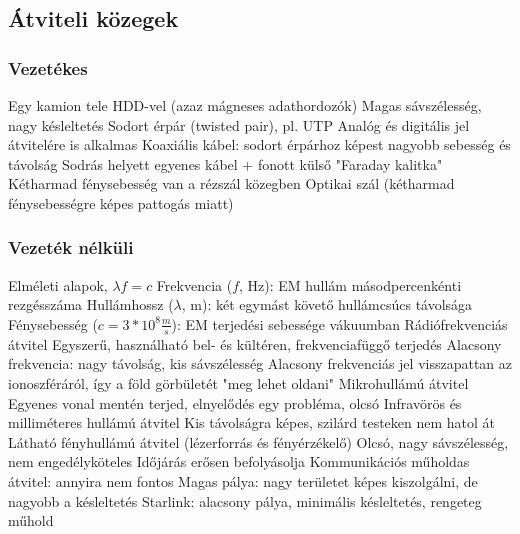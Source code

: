 \documentclass[12pt,a4paper]{article}
\begin{document}
\subsection{Átviteli közegek}

\subsubsection{Vezetékes}

\begin{outline}
	\1 Egy kamion tele HDD-vel (azaz mágneses adathordozók)
		\2 Magas sávszélesség, nagy késleltetés
	\1 Sodort érpár (twisted pair), pl. UTP
		\2 Analóg és digitális jel átvitelére is alkalmas
	\1 Koaxiális kábel: sodort érpárhoz képest nagyobb sebesség és távolság
		\2 Sodrás helyett egyenes kábel + fonott külső "Faraday kalitka"
		\2 Kétharmad fénysebesség van a rézszál közegben
	\1 Optikai szál (kétharmad fénysebességre képes pattogás miatt)
\end{outline}

\pagebreak

\subsubsection{Vezeték nélküli}

\begin{outline}
	\1 Elméleti alapok, $\lambda f = c$
		\2 Frekvencia ($f$, Hz): EM hullám másodpercenkénti rezgésszáma
		\2 Hullámhossz ($\lambda$, m): két egymást követő hullámcsúcs távolsága
		\2 Fénysebesség ($c=3*10^8 \frac{m}{s}$): EM terjedési sebessége vákuumban
	\1 Rádiófrekvenciás átvitel
		\2 Egyszerű, használható bel- és kültéren, frekvenciafüggő terjedés
		\2 Alacsony frekvencia: nagy távolság, kis sávszélesség
		\2 Alacsony frekvenciás jel visszapattan az ionoszféráról, így a föld görbületét "meg lehet oldani"
	\1 Mikrohullámú átvitel
		\2 Egyenes vonal mentén terjed, elnyelődés egy probléma, olcsó
	\1 Infravörös és milliméteres hullámú átvitel
		\2 Kis távolságra képes, szilárd testeken nem hatol át
	\1 Látható fényhullámú átvitel (lézerforrás és fényérzékelő)
		\2 Olcsó, nagy sávszélesség, nem engedélyköteles
		\2 Időjárás erősen befolyásolja
	\1 Kommunikációs műholdas átvitel: annyira nem fontos
		\2 Magas pálya: nagy területet képes kiszolgálni, de nagyobb a késleltetés
		\2 Starlink: alacsony pálya, minimális késleltetés, rengeteg műhold
\end{outline}

\pagebreak
\end{document}
